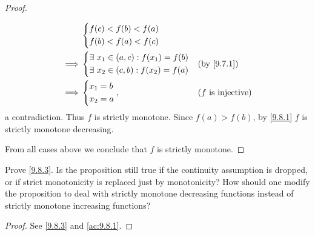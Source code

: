 \begin{proof}
\begin{itemize}
\begin{align*}
                     & \begin{dcases}
                         f(c) < f(b) < f(a) \\
                         f(b) < f(a) < f(c)
                       \end{dcases}                                                         \\
            \implies & \begin{dcases}
                         \exists\ x_1 \in (a, c) : f(x_1) = f(b) \\
                         \exists\ x_2 \in (c, b) : f(x_2) = f(a) \\
                       \end{dcases} &  & \by{9.7.1}                                    \\
            \implies & \begin{dcases}
                         x_1 = b \\
                         x_2 = a
                       \end{dcases},                             &  & \text{(\(f\) is injective)}
          \end{align*}
          a contradiction.
          Thus \(f\) is strictly monotone.
          Since \(f(a) > f(b)\), by \cref{9.8.1} \(f\) is strictly monotone decreasing.
  \end{itemize}
  From all cases above we conclude that \(f\) is strictly monotone.
\end{proof}

\begin{ex}\label{ex:9.8.4}
  Prove \cref{9.8.3}.
  Is the proposition still true if the continuity assumption is dropped, or if strict monotonicity is replaced just by monotonicity?
  How should one modify the proposition to deal with strictly monotone decreasing functions instead of strictly monotone increasing functions?
\end{ex}

\begin{proof}
  See \cref{9.8.3} and \cref{ac:9.8.1}.
\end{proof}

